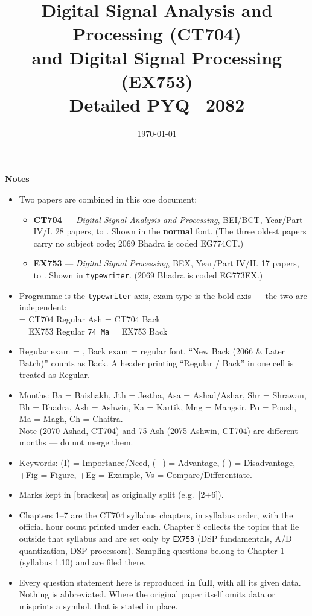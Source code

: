 \documentclass[12pt]{article}
\title{Digital Signal Analysis and Processing (CT704)\\[0.2em]
\large and Digital Signal Processing (EX753)\\[0.4em]
\large Detailed PYQ \quad 2066--2082}
\author{}
\date{\today}
\begin{document}
\maketitle
\vspace{4cm}
\textbf{Notes}
\begin{itemize}[noitemsep]
  \item Two papers are combined in this one document:
    \begin{itemize}[noitemsep]
      \item \textbf{CT704} --- \emph{Digital Signal Analysis and Processing}, BEI/BCT, Year/Part IV/I. 28 papers,  to . Shown in the \textbf{normal} font. (The three oldest papers carry no subject code; 2069 Bhadra is coded EG774CT.)
      \item \textbf{EX753} --- \emph{Digital Signal Processing}, BEX, Year/Part IV/II. 17 papers,  to . Shown in \texttt{typewriter}. (2069 Bhadra is coded EG773EX.)
    \end{itemize}
  \item Programme is the \texttt{typewriter} axis, exam type is the bold axis --- the two are independent:\\
     = CT704 Regular  Ash = CT704 Back\\
     = EX753 Regular \qquad \texttt{74 Ma} = EX753 Back
  \item Regular exam = , Back exam = regular font. ``New Back (2066 \& Later Batch)'' counts as Back. A header printing ``Regular / Back'' in one cell is treated as Regular.
  \item Months: Ba = Baishakh, Jth = Jestha, Asa = Ashad/Ashar, Shr = Shrawan, Bh = Bhadra, Ash = Ashwin, Ka = Kartik, Mng = Mangsir, Po = Poush, Ma = Magh, Ch = Chaitra.\\
    Note  (2070 Ashad, CT704) and 75 Ash (2075 Ashwin, CT704) are different months --- do not merge them.
  \item Keywords: (I) = Importance/Need, (+) = Advantage, (-) = Disadvantage, +Fig = Figure, +Eg = Example, Vs = Compare/Differentiate.
  \item Marks kept in [brackets] as originally split (e.g.\ [2+6]).
  \item Chapters 1--7 are the CT704 syllabus chapters, in syllabus order, with the official hour count printed under each. Chapter 8 collects the topics that lie outside that syllabus and are set only by \texttt{EX753} (DSP fundamentals, A/D quantization, DSP processors). Sampling questions belong to Chapter 1 (syllabus 1.10) and are filed there.
  \item Every question statement here is reproduced \textbf{in full}, with all its given data. Nothing is abbreviated. Where the original paper itself omits data or misprints a symbol, that is stated in place.
\end{itemize}
\pagebreak
\tableofcontents
\pagebreak
\end{document}
